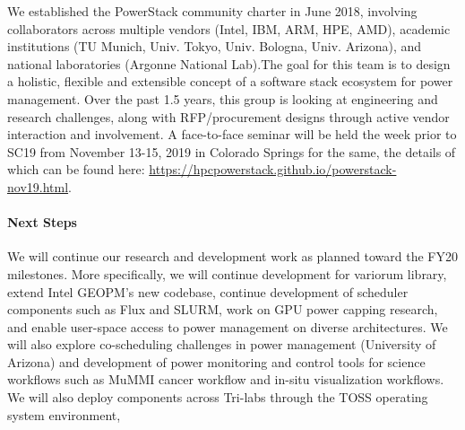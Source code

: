 We established the PowerStack community charter in June 2018, involving collaborators across multiple vendors (Intel, IBM, ARM, HPE, AMD), academic institutions (TU Munich, Univ. Tokyo, Univ. Bologna, Univ. Arizona), and national laboratories (Argonne National Lab).The goal for this team is to design a holistic, flexible and extensible concept of a software stack ecosystem for power management. Over the past 1.5 years, this group is looking at engineering and research challenges, along with RFP/procurement designs through active vendor interaction and involvement. A face-to-face seminar will be held the week prior to SC19 from November 13-15, 2019 in Colorado Springs for the same, the details of which can be found here: \url{https://hpcpowerstack.github.io/powerstack-nov19.html}. 

\paragraph{Next Steps}
We will continue our research and development work as planned toward the FY20 milestones. More specifically, we will continue development for variorum library, extend Intel GEOPM's new codebase, continue development of scheduler components such as Flux and SLURM, work on GPU power capping research, and enable user-space access to power management on diverse architectures. We will also explore co-scheduling challenges in power management (University of Arizona) and development of power monitoring and control tools for science workflows such as MuMMI cancer workflow and in-situ visualization workflows. We will also deploy components across Tri-labs through the TOSS operating system environment, 

